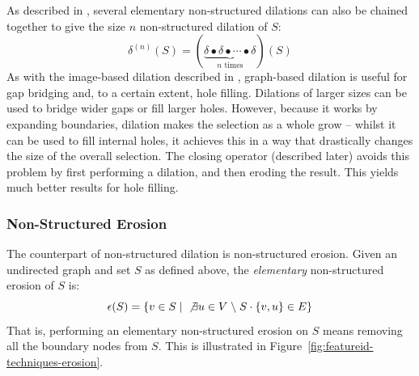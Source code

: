 As described in \cite{heijmans92a}, several elementary non-structured dilations can also be chained together to give the size $n$ non-structured dilation of $S$:
%
\[
\delta^{(n)}(S) = (\underbrace{\delta \bullet \delta \bullet \cdots \bullet \delta}_{n \mbox{ times}})(S)
\]
%
As with the image-based dilation described in \cite{gonzalez02}, graph-based dilation is useful for gap bridging and, to a certain extent, hole filling. Dilations of larger sizes can be used to bridge wider gaps or fill larger holes. However, because it works by expanding boundaries, dilation makes the selection as a whole grow -- whilst it can be used to fill internal holes, it achieves this in a way that drastically changes the size of the overall selection. The closing operator (described later) avoids this problem by first performing a dilation, and then eroding the result. This yields much better results for hole filling.

\subsubsection{Non-Structured Erosion}

The counterpart of non-structured dilation is non-structured erosion. Given an undirected graph and set $S$ as defined above, the \emph{elementary} non-structured erosion of $S$ is:
%
\[
\epsilon(S) = \{v \in S \; | \; \not\exists u \in V \; \backslash \; S \cdot \{v,u\} \in E\}
\]
%
That is, performing an elementary non-structured erosion on $S$ means removing all the boundary nodes from $S$. This is illustrated in Figure~\ref{fig:featureid-techniques-erosion}.

